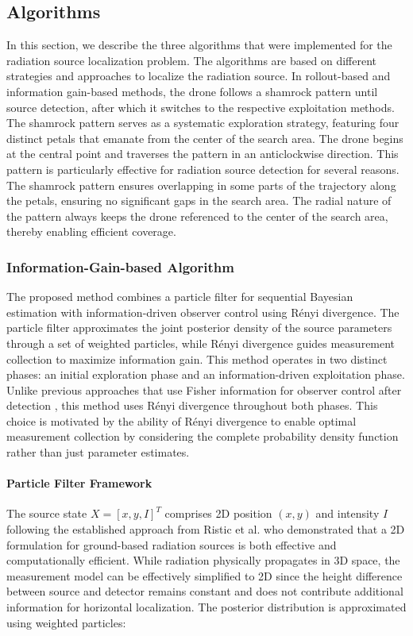 \documentclass[../report.tex]{subfiles}
\begin{document}
    \subsection{Algorithms}

    In this section, we describe the three algorithms that were implemented for the radiation source localization problem. The algorithms are based on different strategies and approaches to
    localize the radiation source. In rollout-based and information gain-based methods, the drone follows a shamrock pattern until source detection, after which it switches to the 
    respective exploitation methods. The shamrock pattern serves as a systematic exploration strategy, featuring four distinct petals that emanate from the center of the search area. 
    The drone begins at the central point and traverses the pattern in an anticlockwise direction. This pattern is particularly effective for radiation source detection for several reasons.
    The shamrock pattern ensures overlapping in some parts of the trajectory along the petals, ensuring no significant gaps in the search area. The radial nature of the pattern always 
    keeps the drone referenced to the center of the search area, thereby enabling efficient coverage.

    \subsubsection{Information-Gain-based Algorithm}

    The proposed method combines a particle filter for sequential Bayesian estimation with information-driven observer control using Rényi divergence. The particle filter approximates
    the joint posterior density of the source parameters through a set of weighted particles, while Rényi divergence guides measurement collection to maximize information gain. 
    This method operates in two distinct phases: an initial exploration phase and an information-driven exploitation phase. Unlike previous approaches that use Fisher information for observer control
    after detection \cite{Ristic2007AnIG}, this method uses Rényi divergence throughout both phases. This choice is motivated by the ability of Rényi divergence to enable optimal measurement collection 
    by considering the complete probability density function rather than just parameter estimates.

    \paragraph{Particle Filter Framework}
    The source state $X = [x, y, I]^T$ comprises 2D position $(x,y)$ and intensity $I$ following the established approach from Ristic et al. who demonstrated that a 2D formulation for ground-based 
    radiation sources is both effective and computationally efficient. While radiation physically propagates in 3D space, the measurement model can be effectively simplified to 2D since the height
    difference between source and detector remains constant and does not contribute additional information for horizontal localization. 
    The posterior distribution is approximated using weighted particles:
\end{document}
